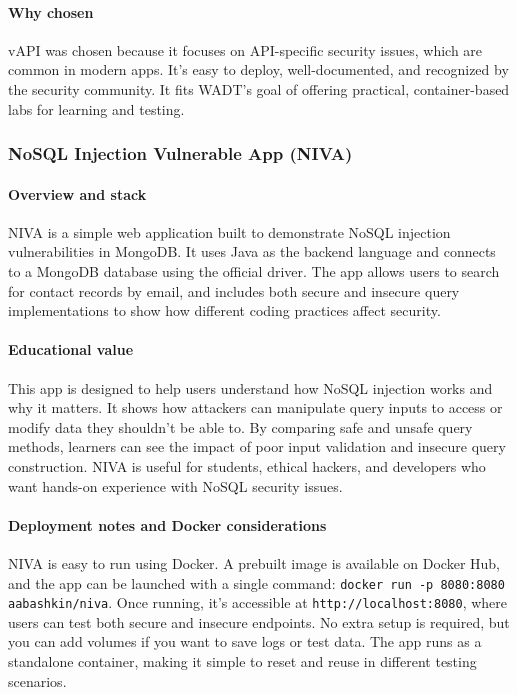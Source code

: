 \documentclass[12pt]{article}
\begin{document}
\paragraph{Why chosen}
vAPI was chosen because it focuses on API-specific security issues, which are common in modern apps. It’s easy to deploy, well-documented, and recognized by the security community. It fits WADT’s goal of offering practical, container-based labs for learning and testing.

\subsubsection{NoSQL Injection Vulnerable App (NIVA)}

\paragraph{Overview and stack}
NIVA is a simple web application built to demonstrate NoSQL injection vulnerabilities in MongoDB. It uses Java as the backend language and connects to a MongoDB database using the official driver. The app allows users to search for contact records by email, and includes both secure and insecure query implementations to show how different coding practices affect security.

\paragraph{Educational value}
This app is designed to help users understand how NoSQL injection works and why it matters. It shows how attackers can manipulate query inputs to access or modify data they shouldn’t be able to. By comparing safe and unsafe query methods, learners can see the impact of poor input validation and insecure query construction. NIVA is useful for students, ethical hackers, and developers who want hands-on experience with NoSQL security issues.

\paragraph{Deployment notes and Docker considerations}
NIVA is easy to run using Docker. A prebuilt image is available on Docker Hub, and the app can be launched with a single command: \texttt{docker run -p 8080:8080 aabashkin/niva}. Once running, it’s accessible at \texttt{http://localhost:8080}, where users can test both secure and insecure endpoints. No extra setup is required, but you can add volumes if you want to save logs or test data. The app runs as a standalone container, making it simple to reset and reuse in different testing scenarios.
\end{document}
